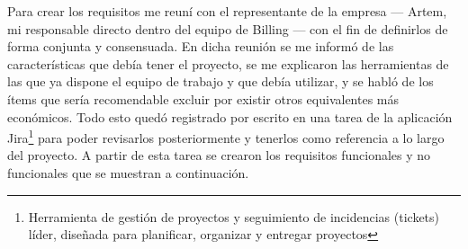 Para crear los requisitos me reuní con el representante de la empresa --- Artem, mi responsable directo dentro del equipo de Billing --- con el fin de definirlos de forma conjunta y consensuada. En dicha reunión se me informó de las características que debía tener el proyecto, se me explicaron las herramientas de las que ya dispone el equipo de trabajo y que debía utilizar, y se habló de los ítems que sería recomendable excluir por existir otros equivalentes más económicos. Todo esto quedó registrado por escrito en una tarea de la aplicación Jira\footnote{Herramienta de gestión de proyectos y seguimiento de incidencias (tickets) líder, diseñada para planificar, organizar y entregar proyectos} para poder revisarlos posteriormente y tenerlos como referencia a lo largo del proyecto. A partir de esta tarea se crearon los requisitos funcionales y no funcionales que se muestran a continuación.

